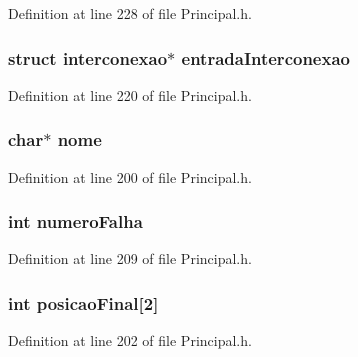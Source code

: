 Definition at line 228 of file Principal.\-h.

\hypertarget{structinterconexao_a4e737e84160630dcb4b4a314d068361d}{
\subsubsection[{entrada\-Interconexao}]{\setlength{\rightskip}{0pt plus 5cm}struct {\bf interconexao}$\ast$ entrada\-Interconexao}}\label{structinterconexao_a4e737e84160630dcb4b4a314d068361d}


Definition at line 220 of file Principal.\-h.

\hypertarget{structinterconexao_ae2a0f66178bb1c4d42e2b70ec9426ccb}{
\subsubsection[{nome}]{\setlength{\rightskip}{0pt plus 5cm}char$\ast$ nome}}\label{structinterconexao_ae2a0f66178bb1c4d42e2b70ec9426ccb}


Definition at line 200 of file Principal.\-h.

\hypertarget{structinterconexao_a131582956c0866fc51a6855fef6a3cb5}{
\subsubsection[{numero\-Falha}]{\setlength{\rightskip}{0pt plus 5cm}int numero\-Falha}}\label{structinterconexao_a131582956c0866fc51a6855fef6a3cb5}


Definition at line 209 of file Principal.\-h.

\hypertarget{structinterconexao_a744a0aae2f2c8216f4e62181f4eef596}{
\subsubsection[{posicao\-Final}]{\setlength{\rightskip}{0pt plus 5cm}int posicao\-Final\mbox{[}2\mbox{]}}}\label{structinterconexao_a744a0aae2f2c8216f4e62181f4eef596}


Definition at line 202 of file Principal.\-h.

